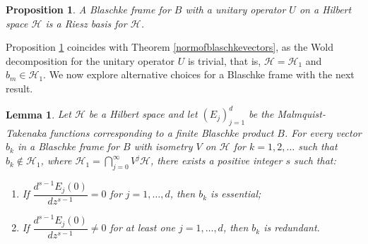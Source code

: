 \documentclass[10pt, reqno]{amsart}
\newtheorem{lemma}[theorem]{Lemma}
\newtheorem{proposition}[theorem]{Proposition}
\theoremstyle{definition}
\numberwithin{equation}{section}
\begin{document}
\begin{proposition}\label{propunitary}
    A Blaschke frame for $B$ with a unitary operator $U$ on a Hilbert space $\mathcal{H}$ is a Riesz basis for $\mathcal{H}$. 
\end{proposition}

Proposition \ref{propunitary} coincides with Theorem \ref{normofblaschkevectors}, as the Wold decomposition for the unitary operator $U$ is trivial, that is, $\mathcal{H}=\mathcal{H}_{1}$ and $b_{m}\in\mathcal{H}_{1}$. We now explore alternative choices for a Blaschke frame with the next result.

\begin{lemma}\label{redundancycor}
Let $\mathcal{H}$ be a Hilbert space and let $(E_{j})_{j=1}^{d}$ be the Malmquist-Takenaka functions corresponding to a finite Blaschke product $B$. For every vector $b_{k}$ in a Blaschke frame for $B$ with isometry $V$ on $\mathcal{H}$ for $k=1,2,\hdots$ such that $b_{k}\not\in\mathcal{H}_{1}$, where $\mathcal{H}_{1}=\bigcap_{j=0}^{\infty}V^{j}\mathcal{H}$, there exists a positive integer $s$ such that:

\begin{enumerate}
     \item  If $\dfrac{d^{s-1}E_{j}(0)}{dz^{s-1}} = 0$ for $j=1,\hdots,d$, then $b_{k}$ is essential;
     \vspace{0.2cm}
         \item  If $\dfrac{d^{s-1}E_{j}(0)}{dz^{s-1}} \neq 0$ for at least one $j=1,\hdots,d$, then $b_{k}$ is redundant.
\end{enumerate}

\end{lemma}
\end{document}
